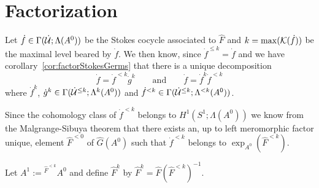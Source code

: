 \section{Factorization}

Let $\dot f\in\Gamma(\dot{\mathcal{U}};\Lambda(A^0))$ be the Stokes cocycle associated to
$\hat F$ and $k=\max(\mathcal{K}(\dot f))$ be the maximal level beared by $\dot f$.
We then know, since $\dot f^{\leq k}=\dot f$ and we have
corollary~\ref{cor:factorStokesGerms} that there is a unique decomposition
\[
  \dot f=\dot f^{<k}\dot g^k
  \qquad\text{and}\qquad
  \dot f=\dot f^k\dot f^{<k}
\]
where $\dot f^k$, $\dot g^k\in\Gamma(\dot{\mathcal{U}}^{\leq k};\Lambda^k(A^0))$ and
$\dot f^{<k}\in\Gamma(\dot{\mathcal{U}}^{\leq k};\Lambda^{<k}(A^0))$.

Since the cohomology class of $\dot f^{<k}$ belongs to $H^1(S^1;\Lambda(A^0))$
we know from the Malgrange-Sibuya theorem that there exists an, up to left
meromorphic factor unique, element $\hat F^{<0}$ of $\hat G(A^0)$ such that
$\dot f^{<k}$ belongs to $\exp_{A^0}(\hat F^{<k})$.

Let $A^1:={}^{\hat F^{<k}}\!A^0$ and define $\hat F^k$ by
$\hat F^k=\hat F(\hat F^{<k})^{-1}$.

\TODO[\dots]


